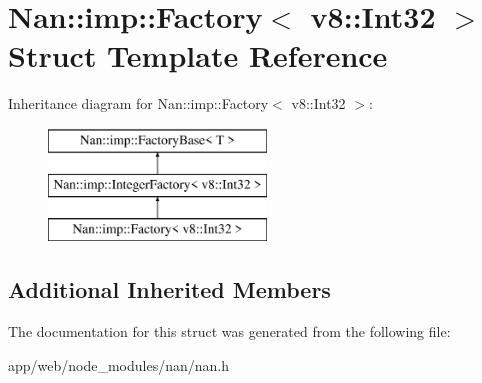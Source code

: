\hypertarget{struct_nan_1_1imp_1_1_factory_3_01v8_1_1_int32_01_4}{}\section{Nan\+:\+:imp\+:\+:Factory$<$ v8\+:\+:Int32 $>$ Struct Template Reference}
\label{struct_nan_1_1imp_1_1_factory_3_01v8_1_1_int32_01_4}
Inheritance diagram for Nan\+:\+:imp\+:\+:Factory$<$ v8\+:\+:Int32 $>$\+:\begin{figure}[H]
\begin{center}
\leavevmode
\includegraphics[height=3.000000cm]{struct_nan_1_1imp_1_1_factory_3_01v8_1_1_int32_01_4}
\end{center}
\end{figure}
\subsection*{Additional Inherited Members}


The documentation for this struct was generated from the following file\+:\begin{DoxyCompactItemize}
\item 
app/web/node\+\_\+modules/nan/nan.\+h\end{DoxyCompactItemize}
